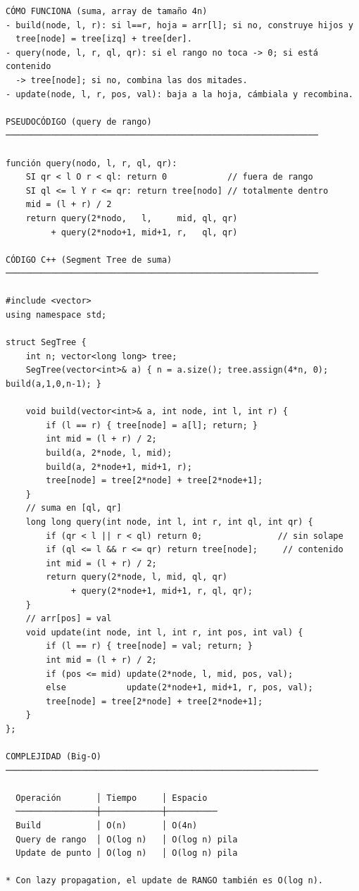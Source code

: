 \begin{lstlisting}
CÓMO FUNCIONA (suma, array de tamaño 4n)
- build(node, l, r): si l==r, hoja = arr[l]; si no, construye hijos y
  tree[node] = tree[izq] + tree[der].
- query(node, l, r, ql, qr): si el rango no toca -> 0; si está contenido
  -> tree[node]; si no, combina las dos mitades.
- update(node, l, r, pos, val): baja a la hoja, cámbiala y recombina.

PSEUDOCÓDIGO (query de rango)
──────────────────────────────────────────────────────────────

función query(nodo, l, r, ql, qr):
    SI qr < l O r < ql: return 0            // fuera de rango
    SI ql <= l Y r <= qr: return tree[nodo] // totalmente dentro
    mid = (l + r) / 2
    return query(2*nodo,   l,     mid, ql, qr)
         + query(2*nodo+1, mid+1, r,   ql, qr)

CÓDIGO C++ (Segment Tree de suma)
──────────────────────────────────────────────────────────────

#include <vector>
using namespace std;

struct SegTree {
    int n; vector<long long> tree;
    SegTree(vector<int>& a) { n = a.size(); tree.assign(4*n, 0); build(a,1,0,n-1); }

    void build(vector<int>& a, int node, int l, int r) {
        if (l == r) { tree[node] = a[l]; return; }
        int mid = (l + r) / 2;
        build(a, 2*node, l, mid);
        build(a, 2*node+1, mid+1, r);
        tree[node] = tree[2*node] + tree[2*node+1];
    }
    // suma en [ql, qr]
    long long query(int node, int l, int r, int ql, int qr) {
        if (qr < l || r < ql) return 0;               // sin solape
        if (ql <= l && r <= qr) return tree[node];     // contenido
        int mid = (l + r) / 2;
        return query(2*node, l, mid, ql, qr)
             + query(2*node+1, mid+1, r, ql, qr);
    }
    // arr[pos] = val
    void update(int node, int l, int r, int pos, int val) {
        if (l == r) { tree[node] = val; return; }
        int mid = (l + r) / 2;
        if (pos <= mid) update(2*node, l, mid, pos, val);
        else            update(2*node+1, mid+1, r, pos, val);
        tree[node] = tree[2*node] + tree[2*node+1];
    }
};

COMPLEJIDAD (Big-O)
──────────────────────────────────────────────────────────────

  Operación       │ Tiempo     │ Espacio
  ────────────────┼────────────┼──────────
  Build           │ O(n)       │ O(4n)
  Query de rango  │ O(log n)   │ O(log n) pila
  Update de punto │ O(log n)   │ O(log n) pila

* Con lazy propagation, el update de RANGO también es O(log n).
\end{lstlisting}


